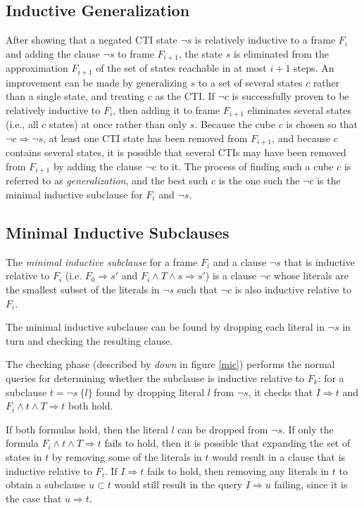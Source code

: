 \documentclass[12pt,a4paper,twoside,openright]{report}
\begin{document}
{\subsection{Inductive Generalization}

After showing that a negated CTI state $\neg s$ is relatively inductive to a
frame $F_i$ and adding the clause $\neg s$ to frame $F_{i + 1}$, the state
$s$ is eliminated from the approximation $F_{i + 1}$ of the set of states
reachable in at most $i + 1$ steps. An improvement can be made by generalizing
$s$ to a set of several states $c$ rather than a single state, and treating
$c$ as the CTI. If $\neg c$ is successfully proven to be relatively inductive
to $F_i$, then adding it to frame $F_{i + 1}$ eliminates several states (i.e.,
all $c$ states) at once rather than only $s$. Because the cube $c$
is chosen so that $\neg c \Rightarrow \neg s$, at least one CTI state
has been removed from $F_{i + 1}$, and because $c$ contains several states,
it is possible that several CTIs may have been removed from $F_{i + 1}$
by adding the clause $\neg c$ to it. The process of finding such a cube $c$
is referred to as \emph{generalization}, and the best such $c$ is the
one such the $\neg c$ is the minimal inductive subclause for $F_i$ and $\neg s$.

\subsection{Minimal Inductive Subclauses}
The \emph{minimal inductive subclause} for a frame $F_i$ and a clause $\neg s$ that
is inductive relative to $F_i$
(i.e. $F_0 \Rightarrow s'$ and $F_i \wedge T \wedge s \Rightarrow s'$)
is a clause $\neg c$ whose
literals are the smallest subset of the literals in $\neg s$ such that
$\neg c$ is also inductive relative to $F_i$.

The minimal inductive subclause can be found by dropping each literal
in $\neg s$ in turn and checking the resulting clause.

The checking phase (described by {\it down} in figure \ref{mic})
performs the normal queries
for determining whether the subclause is inductive relative to
$F_k$: for a subclause $t = \neg s \ \{l\}$ found by dropping
literal $l$ from $\neg s$, it checks that
$I \Rightarrow t$ and $F_i \wedge t \wedge T \Rightarrow t$ both hold.

If both formulas hold, then the literal $l$ can be dropped from $\neg s$.
If only the formula $F_i \wedge t \wedge T \Rightarrow t$ fails to hold, then
it is possible that expanding the set of states in $t$ by removing some of the
literals in $t$ would result in a clause that is inductive relative to $F_i$.
If $I \Rightarrow t$ fails to hold, then removing any literals in $t$ to
obtain a subclause $u \subset t$ would still result in the query $I \Rightarrow u$
failing, since it is the case that $u \Longrightarrow t$.

}
\end{document}
